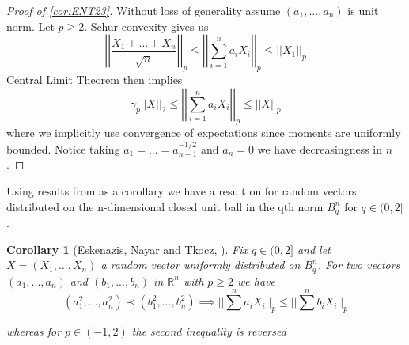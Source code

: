 \documentclass[10pt]{article}
\newcommand{\1}{\textbf{1}}
\newcommand{\R}{\mathbb{R}}
\newcommand{\norm}[1]{\left\lvert\left\lvert#1\right\rvert\right\rvert}
\newtheorem{corollary}{Corollary}[subsection]
\theoremstyle{remark}
\theoremstyle{definition}
\begin{document}
\begin{proof}[Proof of \ref{cor:ENT23}]
	Without loss of generality assume $(a_1,...,a_n)$ is unit norm. Let $p \geq 2$. Schur convexity gives us
	\begin{equation}
		\norm{\frac{X_1+...+X_n}{\sqrt{n}}}_p \leq \norm{\sum_{i=1}^na_i X_i}_p \leq \norm{X_1}_p
	\end{equation}
	Central Limit Theorem then implies
	\begin{equation*}
		\gamma_p \norm{X}_2 \leq \norm{\sum_{i=1}^n a_iX_i}_p \leq \norm{X}_p
	\end{equation*}
	where we implicitly use convergence of expectations since moments are uniformly bounded. Notice taking $a_1=...=a_{n-1}^{-1/2}$ and $a_n = 0$ we have decreasingness in $n$. 
\end{proof}
	
Using results from \cite{BGMN} as a corollary we have a result on for random vectors distributed on the n-dimensional closed unit ball in the qth norm $B_q^n$ for $q \in (0,2]$.

\begin{corollary}[Eskenazis, Nayar and Tkocz, \cite{ENT}]\label{cor:ENT4}
	Fix $q \in (0,2]$ and let $X = (X_1,...,X_n)$ a random vector uniformly distributed on $B_q^n$. For two vectors $(a_1,...,a_n)$ and $(b_1,...,b_n)$ in $\R^n$ with $p \geq 2$ we have
	\begin{equation*}
		(a_1^2,...,a_n^2) \prec (b_1^2,...,b_n^2) \implies ||\sum^n a_i X_i||_p \leq ||\sum^n b_i X_i||_p
	\end{equation*}

	whereas for $p \in (-1,2)$ the second inequality is reversed
\end{corollary}
\end{document}
